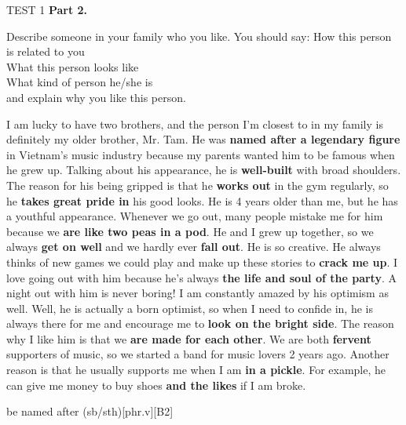 \begin{glossarymc}[Cambridge 6]
\begin{test}{TEST 1}
    \noindent
    \textbf{Part 2.}
    \begin{qa}{Describe someone in your family who you like. You should say:}
    How this person is related to you\\
    What this person looks like\\
    What kind of person he/she is\\
    and explain why you like this person.

    I am lucky to have two brothers, and the person I'm closest to in my family is definitely my older brother, Mr. Tam. He was \textbf{named after a legendary figure} in Vietnam's music industry because my parents wanted him to be famous when he grew up. Talking about his appearance, he is \textbf{well-built} with broad shoulders. The reason for his being gripped is that he \textbf{works out} in the gym regularly, so he \textbf{takes great pride in} his good looks. He is 4 years older than me, but he has a youthful appearance. Whenever we go out, many people mistake me for him because we \textbf{are like two peas in a pod}. He and I grew up together, so we always \textbf{get on well} and we hardly ever \textbf{fall out}. He is so creative. He always thinks of new games we could play and make up these stories to \textbf{crack me up}. I love going out with him because he's always \textbf{the life and soul of the party}. A night out with him is never boring! I am constantly amazed by his optimism as well. Well, he is actually a born optimist, so when I need to confide in, he is always there for me and encourage me to \textbf{look on the bright side}. The reason why I like him is that we \textbf{are made for each other}. We are both \textbf{fervent} supporters of music, so we started a band for music lovers 2 years ago. Another reason is that he usually supports me when I am \textbf{in a pickle}. For example, he can give me money to buy shoes \textbf{and the likes} if I am broke.
    \end{qa}

        \begin{VocabExplain}[Part 2]
            \begin{ExplainCard}{be named after (sb/sth)}[phr.v][B2]
            \end{ExplainCard}
            


\end{VocabExplain}
\end{test}
\end{glossarymc}
